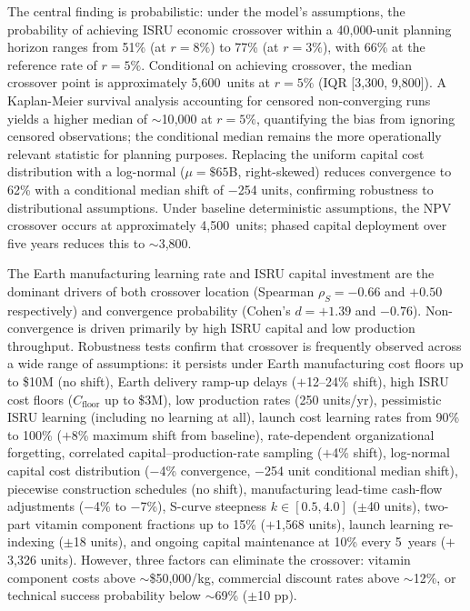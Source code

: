 \documentclass[preprint,12pt]{elsarticle}
\begin{document}
The central finding is probabilistic: under the model's assumptions, the probability of achieving ISRU economic crossover within a 40{,}000-unit planning horizon ranges from 51\% (at $r = 8\%$) to 77\% (at $r = 3\%$), with 66\% at the reference rate of $r = 5\%$. Conditional on achieving crossover, the median crossover point is approximately 5{,}600~units at $r = 5\%$ (IQR [3{,}300, 9{,}800]). A Kaplan-Meier survival analysis accounting for censored non-converging runs yields a higher median of $\sim$10{,}000 at $r = 5\%$, quantifying the bias from ignoring censored observations; the conditional median remains the more operationally relevant statistic for planning purposes. Replacing the uniform capital cost distribution with a log-normal ($\mu = \$65$B, right-skewed) reduces convergence to 62\% with a conditional median shift of $-$254 units, confirming robustness to distributional assumptions. Under baseline deterministic assumptions, the NPV crossover occurs at approximately 4{,}500~units; phased capital deployment over five years reduces this to $\sim$3{,}800.

The Earth manufacturing learning rate and ISRU capital investment are the dominant drivers of both crossover location (Spearman $\rho_S = -0.66$ and $+0.50$ respectively) and convergence probability (Cohen's $d = +1.39$ and $-0.76$). Non-convergence is driven primarily by high ISRU capital and low production throughput. Robustness tests confirm that crossover is frequently observed across a wide range of assumptions: it persists under Earth manufacturing cost floors up to \$10M (no shift), Earth delivery ramp-up delays ($+$12--24\% shift), high ISRU cost floors ($C_{\mathrm{floor}}$ up to \$3M), low production rates (250 units/yr), pessimistic ISRU learning (including no learning at all), launch cost learning rates from 90\% to 100\% ($+$8\% maximum shift from baseline), rate-dependent organizational forgetting, correlated capital--production-rate sampling ($+$4\% shift), log-normal capital cost distribution ($-$4\% convergence, $-$254 unit conditional median shift), piecewise construction schedules (no shift), manufacturing lead-time cash-flow adjustments ($-$4\% to $-$7\%), S-curve steepness $k \in [0.5, 4.0]$ ($\pm$40 units), two-part vitamin component fractions up to 15\% ($+$1{,}568 units), launch learning re-indexing ($\pm$18 units), and ongoing capital maintenance at 10\% every 5~years ($+$3{,}326 units). However, three factors can eliminate the crossover: vitamin component costs above $\sim$\$50{,}000/kg, commercial discount rates above $\sim$12\%, or technical success probability below $\sim$69\% ($\pm$10 pp).
\end{document}
